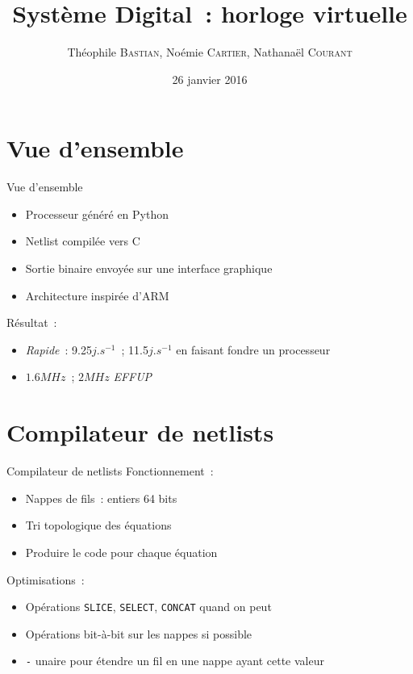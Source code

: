 \documentclass[11pt]{beamer}
\author{Théophile \textsc{Bastian}, Noémie \textsc{Cartier}, Nathanaël \textsc{Courant}}
\title{Système Digital~: horloge virtuelle}
\date{26 janvier 2016}
\begin{document}
\begin{frame}
\titlepage
\end{frame}


\section*{Vue d'ensemble}

\begin{frame}{Vue d'ensemble}
\begin{itemize}
\item Processeur généré en Python
\item Netlist compilée vers C
\item Sortie binaire envoyée sur une interface graphique
\item Architecture inspirée d'ARM
\end{itemize}
Résultat~:
\begin{itemize}
\item \textit{Rapide}~: 9.25$j.s^{-1}$~; 11.5$j.s^{-1}$ en faisant fondre un processeur
\item $1.6MHz$~; $2MHz$ \textit{EFFUP}
\end{itemize}
\end{frame}

\begin{frame}
\setcounter{tocdepth}{1} %
\tableofcontents
\end{frame}

\section{Compilateur de netlists}
\begin{frame}{Compilateur de netlists}
Fonctionnement~:
\begin{itemize}
\item{Nappes de fils~: entiers 64 bits}
\item{Tri topologique des équations}
\item{Produire le code pour chaque équation}
\end{itemize}

Optimisations~:
\begin{itemize}
\item{Opérations \verb!SLICE!, \verb!SELECT!, \verb!CONCAT! quand on
    peut}
\item{Opérations bit-à-bit sur les nappes si possible}
\item{\og{}\verb!-!\fg{} unaire pour étendre un fil en une nappe ayant cette
    valeur}
\end{itemize}
\end{frame}
\end{document}
